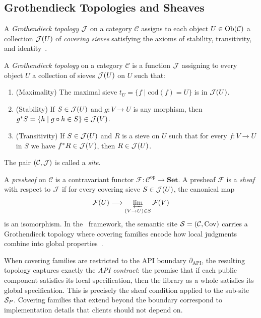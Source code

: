 \documentclass[11pt]{article}
\newcommand{\APIBoundary}{\partial_{\mathrm{API}}}
\begin{document}
\subsection{Grothendieck Topologies and Sheaves}\label{sec:bg-groth}

A \emph{Grothendieck topology} $\mathcal{J}$ on a category $\mathcal{C}$ assigns
to each object $U \in \mathrm{Ob}(\mathcal{C})$ a collection $\mathcal{J}(U)$ of
\emph{covering sieves} satisfying the axioms of stability, transitivity,
and identity~\cite{SGA4,MacLaneMoerdijk1994}.

\begin{definition}\label{def:groth-top}
A \emph{Grothendieck topology} on a category $\mathcal{C}$ is a function
$\mathcal{J}$ assigning to every object $U$ a collection of sieves $\mathcal{J}(U)$ on $U$
such that:
\begin{enumerate}[noitemsep]
  \item (Maximality) The maximal sieve $t_U = \{f \mid \mathrm{cod}(f) = U\}$
        is in $\mathcal{J}(U)$.
  \item (Stability) If $S \in \mathcal{J}(U)$ and $g : V \to U$ is any morphism,
        then $g^{*}S = \{h \mid g \circ h \in S\} \in \mathcal{J}(V)$.
  \item (Transitivity) If $S \in \mathcal{J}(U)$ and $R$ is a sieve on $U$ such
        that for every $f : V \to U$ in $S$ we have $f^{*}R \in \mathcal{J}(V)$,
        then $R \in \mathcal{J}(U)$.
\end{enumerate}
The pair $(\mathcal{C}, \mathcal{J})$ is called a \emph{site}.
\end{definition}

A \emph{presheaf} on $\mathcal{C}$ is a contravariant functor
$\mathcal{F} : \mathcal{C}^{\mathrm{op}} \to \mathbf{Set}$.  A presheaf
$\mathcal{F}$ is a \emph{sheaf} with respect to $\mathcal{J}$ if for every
covering sieve $S \in \mathcal{J}(U)$, the canonical map
\[
  \mathcal{F}(U) \longrightarrow \varprojlim_{(V \to U) \in S} \mathcal{F}(V)
\]
is an isomorphism.  In the \JuGeo\ framework, the semantic site
$\mathcal{S} = (\mathcal{C}, \mathrm{Cov})$ carries a Grothendieck topology where
covering families encode how local judgments combine into global
properties~\cite{JuGeo2023}.

\begin{remark}\label{rem:cover-api}
When covering families are restricted to the API boundary $\APIBoundary$,
the resulting topology captures exactly the \emph{API contract}: the
promise that if each public component satisfies its local specification,
then the library as a whole satisfies its global specification.  This is
precisely the sheaf condition applied to the sub-site $\mathcal{S}_P$.
Covering families that extend beyond the boundary correspond to
implementation details that clients should not depend on.
\end{remark}
\end{document}
